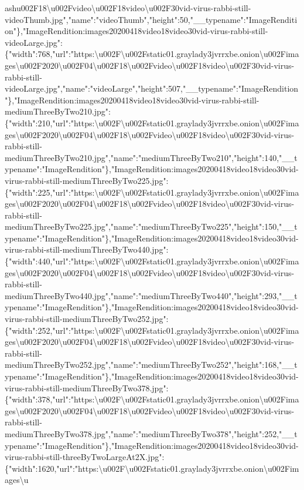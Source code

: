 ash{}u002F18\textbackslash{}u002Fvideo\textbackslash{}u002F18video\textbackslash{}u002F30vid-virus-rabbi-still-videoThumb.jpg","name":"videoThumb","height":50,"\_\_typename":"ImageRendition"\},"ImageRendition:images20200418video18video30vid-virus-rabbi-still-videoLarge.jpg":\{"width":768,"url":"https:\textbackslash{}u002F\textbackslash{}u002Fstatic01.graylady3jvrrxbe.onion\textbackslash{}u002Fimages\textbackslash{}u002F2020\textbackslash{}u002F04\textbackslash{}u002F18\textbackslash{}u002Fvideo\textbackslash{}u002F18video\textbackslash{}u002F30vid-virus-rabbi-still-videoLarge.jpg","name":"videoLarge","height":507,"\_\_typename":"ImageRendition"\},"ImageRendition:images20200418video18video30vid-virus-rabbi-still-mediumThreeByTwo210.jpg":\{"width":210,"url":"https:\textbackslash{}u002F\textbackslash{}u002Fstatic01.graylady3jvrrxbe.onion\textbackslash{}u002Fimages\textbackslash{}u002F2020\textbackslash{}u002F04\textbackslash{}u002F18\textbackslash{}u002Fvideo\textbackslash{}u002F18video\textbackslash{}u002F30vid-virus-rabbi-still-mediumThreeByTwo210.jpg","name":"mediumThreeByTwo210","height":140,"\_\_typename":"ImageRendition"\},"ImageRendition:images20200418video18video30vid-virus-rabbi-still-mediumThreeByTwo225.jpg":\{"width":225,"url":"https:\textbackslash{}u002F\textbackslash{}u002Fstatic01.graylady3jvrrxbe.onion\textbackslash{}u002Fimages\textbackslash{}u002F2020\textbackslash{}u002F04\textbackslash{}u002F18\textbackslash{}u002Fvideo\textbackslash{}u002F18video\textbackslash{}u002F30vid-virus-rabbi-still-mediumThreeByTwo225.jpg","name":"mediumThreeByTwo225","height":150,"\_\_typename":"ImageRendition"\},"ImageRendition:images20200418video18video30vid-virus-rabbi-still-mediumThreeByTwo440.jpg":\{"width":440,"url":"https:\textbackslash{}u002F\textbackslash{}u002Fstatic01.graylady3jvrrxbe.onion\textbackslash{}u002Fimages\textbackslash{}u002F2020\textbackslash{}u002F04\textbackslash{}u002F18\textbackslash{}u002Fvideo\textbackslash{}u002F18video\textbackslash{}u002F30vid-virus-rabbi-still-mediumThreeByTwo440.jpg","name":"mediumThreeByTwo440","height":293,"\_\_typename":"ImageRendition"\},"ImageRendition:images20200418video18video30vid-virus-rabbi-still-mediumThreeByTwo252.jpg":\{"width":252,"url":"https:\textbackslash{}u002F\textbackslash{}u002Fstatic01.graylady3jvrrxbe.onion\textbackslash{}u002Fimages\textbackslash{}u002F2020\textbackslash{}u002F04\textbackslash{}u002F18\textbackslash{}u002Fvideo\textbackslash{}u002F18video\textbackslash{}u002F30vid-virus-rabbi-still-mediumThreeByTwo252.jpg","name":"mediumThreeByTwo252","height":168,"\_\_typename":"ImageRendition"\},"ImageRendition:images20200418video18video30vid-virus-rabbi-still-mediumThreeByTwo378.jpg":\{"width":378,"url":"https:\textbackslash{}u002F\textbackslash{}u002Fstatic01.graylady3jvrrxbe.onion\textbackslash{}u002Fimages\textbackslash{}u002F2020\textbackslash{}u002F04\textbackslash{}u002F18\textbackslash{}u002Fvideo\textbackslash{}u002F18video\textbackslash{}u002F30vid-virus-rabbi-still-mediumThreeByTwo378.jpg","name":"mediumThreeByTwo378","height":252,"\_\_typename":"ImageRendition"\},"ImageRendition:images20200418video18video30vid-virus-rabbi-still-threeByTwoLargeAt2X.jpg":\{"width":1620,"url":"https:\textbackslash{}u002F\textbackslash{}u002Fstatic01.graylady3jvrrxbe.onion\textbackslash{}u002Fimages\textbackslash{}u